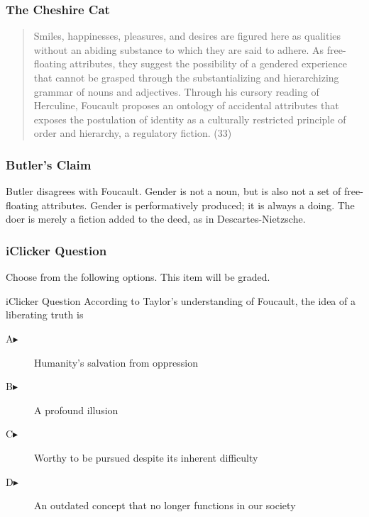\documentclass[xcolor=dvipsnames]{beamer}
\begin{document}
\begin{frame}
  \frametitle{The Cheshire Cat}
  \begin{quote}
    Smiles, happinesses, pleasures, and desires are figured here as
    qualities without an abiding substance to which they are said to
    adhere. As free-floating attributes, they suggest the possibility
    of a gendered experience that cannot be grasped through the
    substantializing and hierarchizing grammar of nouns and
    adjectives. Through his cursory reading of Herculine, Foucault
    proposes an ontology of accidental attributes that exposes the
    postulation of identity as a culturally restricted principle of
    order and hierarchy, a regulatory fiction. (33)
  \end{quote}
\end{frame}

\begin{frame}
  \frametitle{Butler's Claim}
  Butler disagrees with Foucault. Gender is not a noun, but is also
  not a set of free-floating attributes. Gender is performatively
  produced; it is always a doing. The doer is merely a fiction added
  to the deed, as in Descartes-Nietzsche.
\end{frame}

\begin{frame}
  \frametitle{iClicker Question}
Choose from the following options. This item will be graded.
\begin{block}{iClicker Question}
  According to Taylor's understanding of Foucault, the idea of a
  liberating truth is 
\end{block}
\begin{description}
\item[A\hspace{.2in}$\blacktriangleright$] Humanity's salvation from oppression
\item[B\hspace{.2in}$\blacktriangleright$] A profound illusion
\item[C\hspace{.2in}$\blacktriangleright$] Worthy to be pursued despite its inherent difficulty
\item[D\hspace{.2in}$\blacktriangleright$] An outdated concept that no longer functions in our society
\end{description}
\end{frame}
\end{document}
